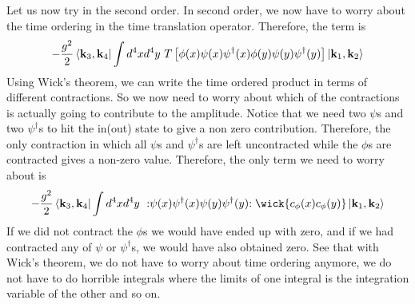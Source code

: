 \documentclass[11pt]{article}
\newcommand{\normord}[1]{:\mathrel{#1}:}
\renewcommand{\c}[1]{c_\mathbf{#1}}
\numberwithin{equation}{section}
\begin{document}
    Let us now try in the second order. In second order, we now have to worry about the time ordering in the time translation operator. Therefore, the term is 
    \begin{equation*}
        -\frac{g^2}{2} \bra{\textbf{k}_3, \textbf{k}_4} \int d^4x d^4y ~T\left[  \phi(x) \psi(x) \psi^\dagger(x)  \phi(y) \psi(y) \psi^\dagger(y)  \right]\ket{\textbf{k}_1, \textbf{k}_2}
    \end{equation*}
    Using Wick's theorem, we can write the time ordered product in terms of different contractions. So we now need to worry about which of the contractions is actually going to contribute to the amplitude. Notice that we need two \(\psi\)s and two \(\psi^\dagger\)s to hit the in(out) state to give a non zero contribution. Therefore, the only contraction in which all \(\psi\)s and \(\psi^\dagger\)s are left uncontracted while the \(\phi\)s are contracted gives a non-zero value. Therefore, the only term we need to worry about is 
    \begin{equation*}
        -\frac{g^2}{2} \bra{\textbf{k}_3, \textbf{k}_4} \int d^4x d^4y~    \normord{\psi(x) \psi^\dagger(x) \psi(y) \psi^\dagger(y)} \wick{\c\phi(x)\c\phi(y)}   \ket{\textbf{k}_1, \textbf{k}_2}
    \end{equation*}
    If we did not contract the \(\phi\)s we would have ended up with zero, and if we had contracted any of \(\psi\) or \(\psi^\dagger\)s, we would have also obtained zero. See that with Wick's theorem, we do not have to worry about time ordering anymore, we do not have to do horrible integrals where the limits of one integral is the integration variable of the other and so on.  \\
\end{document}
